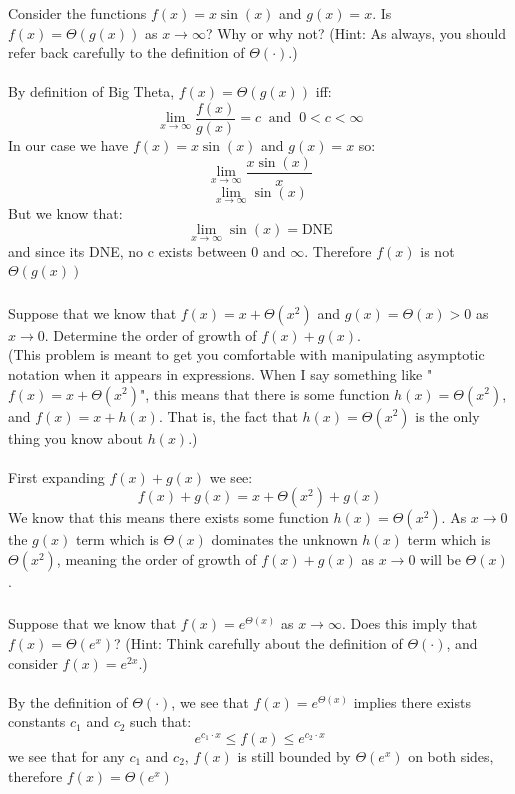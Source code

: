 \documentclass{article}
\begin{document}
\subsubsection{}
Consider the functions $f(x) = x \sin(x)$ and $g(x) = x$. Is $f(x) = \Theta(g(x))$ as $x\to \infty$? Why or
why not? (Hint: As always, you should refer back carefully to the definition of $\Theta(\cdot)$.)
\\\\
By definition of Big Theta, $f(x) = \Theta(g(x))$ iff:
\[\lim_{x\to\infty}\frac{f(x)}{g(x)} = c \;\;\text{and}\;\; 0 < c < \infty\]
In our case we have $f(x) = x \sin(x)$ and $g(x) = x$ so:
\[\lim_{x\to\infty}\frac{x\sin(x)}{x}\]
\[\lim_{x\to\infty}\sin(x)\]
But we know that:
\[\lim_{x\to\infty}\sin(x) = \text{DNE}\]
and since its DNE, no c exists between 0 and $\infty$. Therefore $f(x)$ is not $\Theta(g(x))$

\subsubsection{}
Suppose that we know that $f(x) = x + \Theta(x^2)$ and $g(x) = \Theta(x) > 0$ as $x\to 0$. Determine the order of growth of $f(x) + g(x)$.\\ (This problem is meant to get you comfortable with manipulating asymptotic notation when it appears in expressions. When I say something like "$f(x) = x + \Theta(x^2)$", this means that there is some function $h(x) = \Theta(x^2)$, and $f(x) = x+h(x)$. That is, the fact that $h(x) = \Theta(x^2)$ is the only thing you know about $h(x)$.)
\\\\
First expanding $f(x) + g(x)$ we see:
\[f(x) + g(x) = x + \Theta(x^2) + g(x)\]
We know that this means there exists some function $h(x) = \Theta(x^2)$. As $x\to 0$ the $g(x)$ term which is $\Theta(x)$ dominates the unknown $h(x)$ term which is $\Theta(x^2)$, meaning the order of growth of $f(x) + g(x)$ as $x\to 0$ will be $\Theta(x)$.

\subsubsection{}
Suppose that we know that $f(x) = e^{\Theta(x)}$ as $x\to\infty$. Does this imply that $f(x) = \Theta(e^x)$? (Hint: Think carefully about the definition of $\Theta(\cdot)$, and consider $f(x) = e^{2x}$.)
\\\\
By the definition of $\Theta(\cdot)$, we see that $f(x) = e^{\Theta(x)}$ implies there exists constants $c_1$ and $c_2$ such that:
\[e^{c_1\cdot x} \leq f(x) \leq e^{c_2 \cdot x}\]
we see that for any $c_1$ and $c_2$, $f(x)$ is still bounded by $\Theta(e^x)$ on both sides, therefore $f(x) = \Theta(e^x)$
\end{document}
